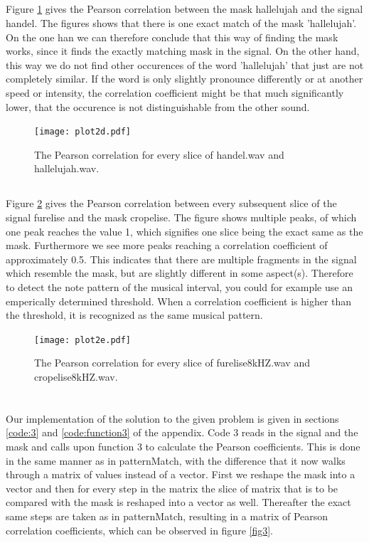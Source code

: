 \documentclass{article}
\begin{document}
\subsection{}
Figure \ref{fig:2d} gives the Pearson correlation between the mask hallelujah and
the signal handel. The figures shows that there is one exact match of the mask 'hallelujah'.
On the one han we can therefore conclude that this way of finding the mask works,
since it finds the exactly matching mask in the signal. On the other hand, this way
we do not find other occurences of the word 'hallelujah' that just are not completely
similar. If the word is only slightly pronounce differently or at another speed or
intensity, the correlation coefficient might be that much significantly lower, that
the occurence is not distinguishable from the other sound.
\begin{figure}[H]
  \centering
  \texttt{[image: plot2d.pdf]}
  \caption{The Pearson correlation for every slice of handel.wav and hallelujah.wav.}
  \label{fig:2d}
\end{figure}

\subsection{}
Figure \ref{fig:2e} gives the Pearson correlation between every subsequent slice of
the signal furelise and the mask cropelise. The figure shows multiple peaks, of which
one peak reaches the value 1, which signifies one slice being the exact same as the mask.
Furthermore we see more peaks reaching a correlation coefficient of approximately 0.5.
This indicates that there are multiple fragments in the signal which resemble the mask,
but are slightly different in some aspect(s). Therefore to detect the note pattern
of the musical interval, you could for example use an emperically determined threshold.
When a correlation coefficient is higher than the threshold, it is recognized as
the same musical pattern.
\begin{figure}[H]
  \centering
  \texttt{[image: plot2e.pdf]}
  \caption{The Pearson correlation for every slice of furelise8kHZ.wav and cropelise8kHZ.wav.}
  \label{fig:2e}
\end{figure}

\section{}
Our implementation of the solution to the given problem is given in sections \ref{code:3} and \ref{code:function3} of the appendix.
Code 3 reads in the signal and the mask and calls upon function 3 to calculate the Pearson coefficients. This is done in the same manner
as in patternMatch, with the difference that it now walks through a matrix of values instead of a vector. First we reshape the mask into
a vector and then for every step in the matrix the slice of matrix that is to be compared with the mask is reshaped into a vector as well.
Thereafter the exact same steps are taken as in patternMatch, resulting in a matrix of Pearson correlation coefficients, which can be
observed in figure \ref{fig3}.
\end{document}
